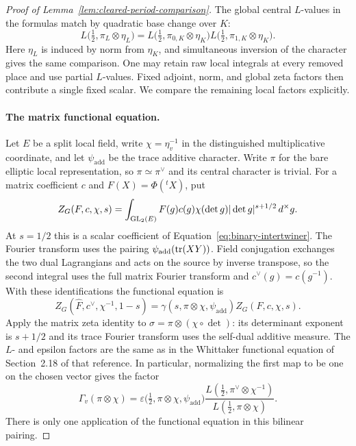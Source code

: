 \begin{proof}[Proof of Lemma~\ref{lem:cleared-period-comparison}]
The global central $L$-values in the formulas match by quadratic base
change over $K$:
\begin{equation}\label{eq:rankin-factorization}
 L\bigl(\tfrac12,\pi_L\otimes\eta_L\bigr)
 =L\bigl(\tfrac12,\pi_{0,K}\otimes\eta_K\bigr)
  L\bigl(\tfrac12,\pi_{1,K}\otimes\eta_K\bigr).
\end{equation}
Here $\eta_L$ is induced by norm from $\eta_K$, and simultaneous inversion
of the character gives the same comparison.  One may retain raw local
integrals at every removed place and use partial $L$-values.  Fixed
adjoint, norm, and global zeta factors then contribute a single fixed
scalar.  We compare the remaining local factors explicitly.

\paragraph{The matrix functional equation.}
Let $E$ be a split local field, write $\chi=\eta_v^{-1}$ in the
distinguished multiplicative coordinate, and let $\psi_{\mathrm{add}}$
be the trace additive character.  Write $\pi$ for the bare elliptic
local representation, so $\pi\simeq\pi^\vee$ and its central character
is trivial.  For a matrix coefficient $c$ and $F(X)=\Phi({}^tX)$, put
\[
 Z_G(F,c,\chi,s)=\int_{\operatorname{GL}_2(E)}
 F(g)c(g)\chi(\det g)|\det g|^{s+1/2}\,d^\times g.
\]
At $s=1/2$ this is a scalar coefficient of
Equation~\ref{eq:binary-intertwiner}.  The Fourier transform uses the
pairing $\psi_{\mathrm{add}}(\operatorname{tr}(XY))$.  Field conjugation exchanges the
two dual Lagrangians and acts on the source by inverse transpose, so
the second integral uses the full matrix Fourier transform and
$c^\vee(g)=c(g^{-1})$.  With these identifications the functional
equation is
\begin{equation}\label{eq:matrix-functional-equation}
 Z_G(\widehat F,c^\vee,\chi^{-1},1-s)
  =\gamma(s,\pi\otimes\chi,\psi_{\mathrm{add}})
     Z_G(F,c,\chi,s).
\end{equation}
Apply the matrix zeta identity
\cite[Theorem~13.1(iii),(v)]{JacquetLanglands1970} to
$\sigma=\pi\otimes(\chi\circ\det)$: its determinant exponent is
$s+1/2$ and its trace Fourier transform uses the self-dual additive
measure.  The $L$- and epsilon factors are the same as in the
Whittaker functional equation of Section~2.18 of that reference.
In particular, normalizing the
first map to be one on the chosen vector gives the factor
\begin{equation}\label{eq:local-gamma-factor}
 \Gamma_v(\pi\otimes\chi)
 =\varepsilon\bigl(\tfrac12,\pi\otimes\chi,\psi_{\mathrm{add}}\bigr)
   \frac{L(\tfrac12,\pi^\vee\otimes\chi^{-1})}
        {L(\tfrac12,\pi\otimes\chi)}.
\end{equation}
There is only one application of the functional equation in this
bilinear pairing.


\end{proof}
